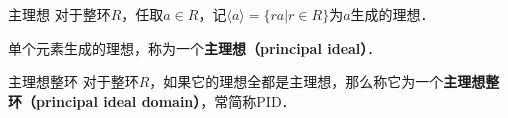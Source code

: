 

\begin{definition}{主理想}
对于整环$R$，任取$a\in R$，记$\langle a \rangle=\{ra|r\in R\}$为$a$生成的理想．

单个元素生成的理想，称为一个\textbf{主理想（principal ideal）}．
\end{definition}

\begin{definition}{主理想整环}
对于整环$R$，如果它的理想全都是主理想，那么称它为一个\textbf{主理想整环（principal ideal domain）}，常简称PID．
\end{definition}







